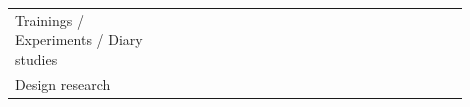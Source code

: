 \documentclass[english, 12pt, a4paper, sci, utf8, a-1b, online]{aaltothesis}
\begin{document}
{\begin{center}
\begin{longtable}{p{0.3\linewidth}p{0.6\linewidth}}
      Trainings / Experiments / Diary studies      & \textcite{nebeling2013informing} \newline \textcite{fontao2018mobile} \newline \textcite{dong2019impact} \newline \textcite{miranda2018improving} \newline \textcite{fontao2016mseco} \newline \textcite{ivo2018approach} \newline \textcite{de2017towards} \newline \textcite{nazariodetecting} \newline \textcite{zhang2018toward} \newline \textcite{silva-comparing}                                                                                                                                                                                                                                                                                                                                                                                                                                                                                                                                                                           \\
      Design research                              & \textcite{henriques2018improving} \newline \textcite{pinter2019polymorph} \newline \textcite{dong2019impact} \newline \textcite{oran2017set}                                                                                                                                                                                                                                                                                                                                                                                                                                                                                                                                                                                                                                                                                                                                                                                                       \\

\end{longtable}
\end{center}}
\end{document}
